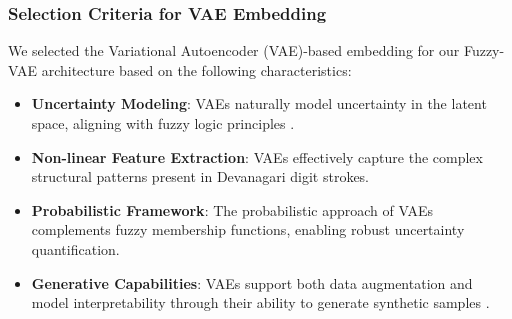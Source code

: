 \documentclass[9pt,a4paper,twoside]{rho-class/rho}
\begin{document}
\begin{table*}[t]
\centering
\renewcommand{\arraystretch}{1.5}
\setlength{\tabcolsep}{12pt}
\caption{Comparison of Embedding Techniques for Devanagari Digit Recognition}
\label{tab:embedding_comparison}
\end{table*}

\subsubsection{Selection Criteria for VAE Embedding}

We selected the Variational Autoencoder (VAE)-based embedding for our Fuzzy-VAE architecture based on the following characteristics:

\begin{itemize}
\item \textbf{Uncertainty Modeling}: VAEs naturally model uncertainty in the latent space, aligning with fuzzy logic principles \cite{kingma}.
\item \textbf{Non-linear Feature Extraction}: VAEs effectively capture the complex structural patterns present in Devanagari digit strokes.
\item \textbf{Probabilistic Framework}: The probabilistic approach of VAEs complements fuzzy membership functions, enabling robust uncertainty quantification.
\item \textbf{Generative Capabilities}: VAEs support both data augmentation and model interpretability through their ability to generate synthetic samples \cite{higgins2017beta}.
\end{itemize}
\end{document}
